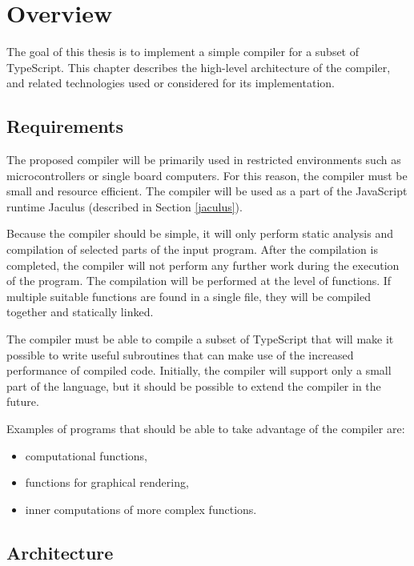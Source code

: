 \chapter{Overview}

The goal of this thesis is to implement a simple compiler for a subset of TypeScript. This chapter describes the high-level architecture of the compiler, and related technologies used or considered for its implementation.

\section{Requirements}

The proposed compiler will be primarily used in restricted environments such as microcontrollers or single board computers. For this reason, the compiler must be small and resource efficient. The compiler will be used as a part of the JavaScript runtime Jaculus (described in Section \ref{jaculus}).

Because the compiler should be simple, it will only perform static analysis and compilation of selected parts of the input program. After the compilation is completed, the compiler will not perform any further work during the execution of the program. The compilation will be performed at the level of functions. If multiple suitable functions are found in a single file, they will be compiled together and statically linked.

The compiler must be able to compile a subset of TypeScript that will make it possible to write useful subroutines that can make use of the increased performance of compiled code. Initially, the compiler will support only a small part of the language, but it should be possible to extend the compiler in the future.

Examples of programs that should be able to take advantage of the compiler are:
\begin{itemize}
    \item computational functions,
    \item functions for graphical rendering,
    \item inner computations of more complex functions.
\end{itemize}

\section{Architecture}


